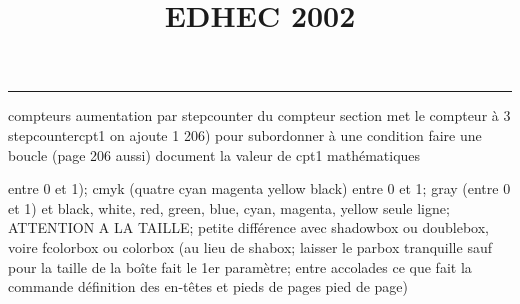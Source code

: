 \documentclass[11pt]{article}%
\title{\bf \vspace{-2cm} EDHEC 2002} %
\author{} %
\date{} %
\renewcommand{\headrulewidth}{0pt}%
\renewcommand{\footrulewidth}{0.4pt}%
\begin{document}
\maketitle %
\vspace{-1.4cm}\hrule %
\thispagestyle{fancy}

\vspace*{.2cm}



compteurs%
aumentation par stepcounter du compteur section%
met le compteur à 3%
stepcounter{cpt1} on ajoute 1%
206) pour subordonner à une condition %
faire une boucle (page 206 aussi) %
document la valeur de cpt1 
mathématiques\newcommand{\ch}{\operatorname{ch}} 
\newcommand{\sh}{\operatorname{sh}}
\renewcommand{\tanh}{\operatorname{th}}
\renewcommand{\sinh}{\operatorname{sh}}
\renewcommand{\cosh}{\operatorname{ch}}
\newcommand{\argsh}{\operatorname{argsh}}
\newcommand{\argch}{\operatorname{argch}}
\newcommand{\argth}{\operatorname{argth}}
\newcommand{\Id}{\operatorname{Id}}
\renewcommand{\leq}{\leq}
\renewcommand{\geq}{\geq }

\newcommand{\dlim}{\lim}
\newcommand{\dsum}{\sum}
\newcommand{\dprod}{\prod}



entre 0 et 1); cmyk (quatre cyan magenta yellow black) entre 0 et 1;
gray (entre 0 et 1) et black, white, red, green, blue, cyan, magenta,
yellow%
seule ligne; ATTENTION A LA TAILLE; petite différence avec shadowbox ou
doublebox, voire fcolorbox ou colorbox (au lieu de shabox; laisser le
parbox tranquille sauf pour la taille de la boîte
\newcommand{\Tbox}[1]{\begin{center} \shabox{\parbox{0.6
\linewidth}{#1}} \end{center}} %
fait le 1er paramètre; entre accolades ce que fait la commande
définition des en-têtes et pieds de pages\pagestyle{fancy}
\chead{}
\rfoot[ \ \thepage]{\thepage}
\cfoot{}
\lfoot{}
\thispagestyle{fancy} %
pied de page)\renewcommand{\footrulewidth}{0.4pt}
\renewcommand{\headrulewidth}{0.4pt}
\end{document}
